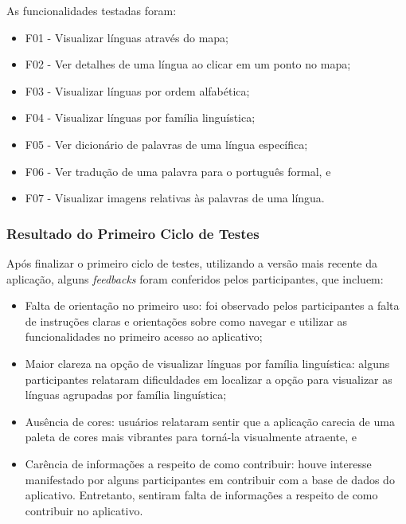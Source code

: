 \begin{description}
    \item As funcionalidades testadas foram:
	\begin{itemize}
		\item F01 - Visualizar línguas através do mapa;
		\item F02 - Ver detalhes de uma língua ao clicar em um ponto no mapa;
		\item F03 - Visualizar línguas por ordem alfabética;
		\item F04 - Visualizar línguas por família linguística;
		\item F05 - Ver dicionário de palavras de uma língua específica;
		\item F06 - Ver tradução de uma palavra para o português formal, e
		\item F07 - Visualizar imagens relativas às palavras de uma língua.
	\end{itemize}
\end{description}

\subsubsection{Resultado do Primeiro Ciclo de Testes}
\label{sec:Resultado do Primeiro Ciclo de Testes}
Após finalizar o primeiro ciclo de testes, utilizando a versão mais recente da aplicação, alguns \textit{feedbacks} foram conferidos pelos participantes, que incluem:

\begin{itemize}
	\item Falta de orientação no primeiro uso: foi observado pelos participantes a falta de instruções claras e orientações sobre como navegar e utilizar as funcionalidades no primeiro acesso ao aplicativo;
	\item Maior clareza na opção de visualizar línguas por família linguística: alguns participantes relataram dificuldades em localizar a opção para visualizar as línguas agrupadas por família linguística;
	\item Ausência de cores: usuários relataram sentir que a aplicação carecia de uma paleta de cores mais vibrantes para torná-la visualmente atraente, e
	\item Carência de informações a respeito de como contribuir: houve interesse manifestado por alguns participantes em contribuir com a base de dados do aplicativo. Entretanto, sentiram falta de informações a respeito 
	de como contribuir no aplicativo.
\end{itemize}

